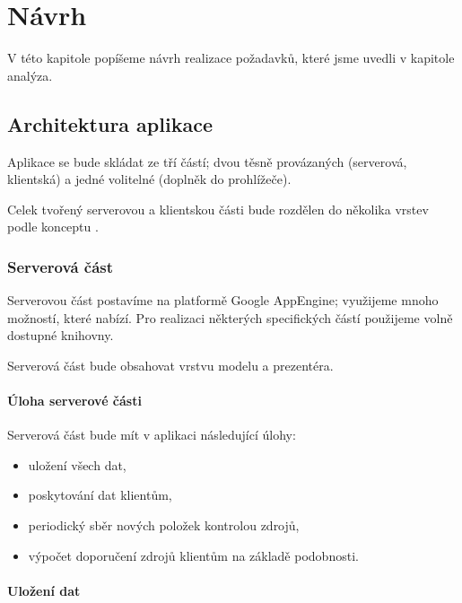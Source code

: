 \chapter{Návrh}

V této kapitole popíšeme návrh realizace požadavků, které jsme uvedli v kapitole analýza.

\section{Architektura aplikace}

Aplikace se bude skládat ze tří částí; dvou těsně provázaných (serverová, klientská) a jedné volitelné (doplněk do prohlížeče).

Celek tvořený serverovou a klientskou části bude rozdělen do několika vrstev podle konceptu .

\subsection{Serverová část}

Serverovou část postavíme na platformě Google AppEngine; využijeme mnoho možností, které nabízí.
Pro realizaci některých specifických částí použijeme volně dostupné knihovny.

Serverová část bude obsahovat vrstvu modelu a prezentéra.

\subsubsection{Úloha serverové části}

Serverová část bude mít v aplikaci následující úlohy:
\begin{itemize}
	\item uložení všech dat,
	\item poskytování dat klientům,
	\item periodický sběr nových položek kontrolou zdrojů,
	\item výpočet doporučení zdrojů klientům na základě podobnosti.
\end{itemize}

\subsubsection{Uložení dat}

